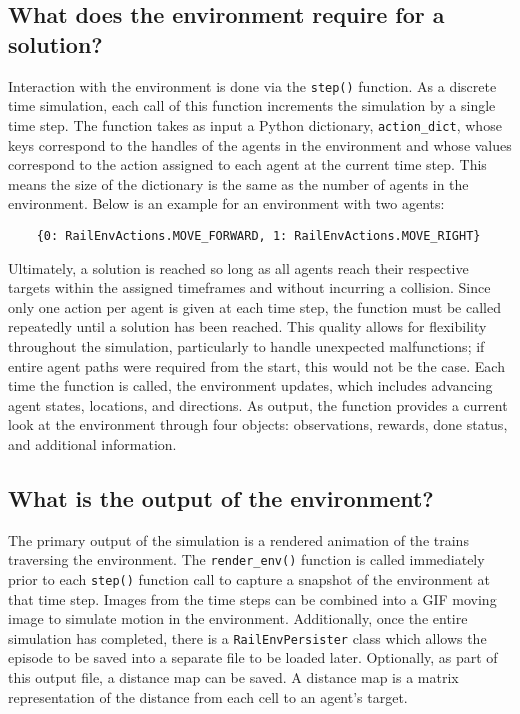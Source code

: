 
\subsection{What does the environment require for a solution?}
Interaction with the environment is done via the \texttt{step()} function.  As a discrete time simulation, each call of this function increments the simulation by a single time step.  
The function takes as input a Python dictionary, \texttt{action\_dict}, whose keys correspond to the handles of the agents in the environment and whose values correspond to the action assigned to each agent at the current time step.  
This means the size of the dictionary is the same as the number of agents in the environment.  
Below is an example for an environment with two agents:
	\begin{verbatim}
	{0: RailEnvActions.MOVE_FORWARD, 1: RailEnvActions.MOVE_RIGHT}
	\end{verbatim}


\noindent Ultimately, a solution is reached so long as all agents reach their respective targets within the assigned timeframes and without incurring a collision.  
Since only one action per agent is given at each time step, the function must be called repeatedly until a solution has been reached.  
This quality allows for flexibility throughout the simulation, particularly to handle unexpected malfunctions; if entire agent paths were required from the start, this would not be the case.  
Each time the function is called, the environment updates, which includes advancing agent states, locations, and directions. 
As output, the function provides a current look at the environment through four objects: observations, rewards, done status, and additional information.

\subsection{What is the output of the environment?}
The primary output of the simulation is a rendered animation of the trains traversing the environment.  
The \texttt{render\_env()} function is called immediately prior to each \texttt{step()} function call to capture a snapshot of the environment at that time step.
Images from the time steps can be combined into a GIF moving image to simulate motion in the environment.
Additionally, once the entire simulation has completed, there is a \texttt{RailEnvPersister} class which allows the episode to be saved into a separate file to be loaded later.  
Optionally, as part of this output file, a distance map can be saved.  A distance map is a matrix representation of the distance from each cell to an agent's target.

